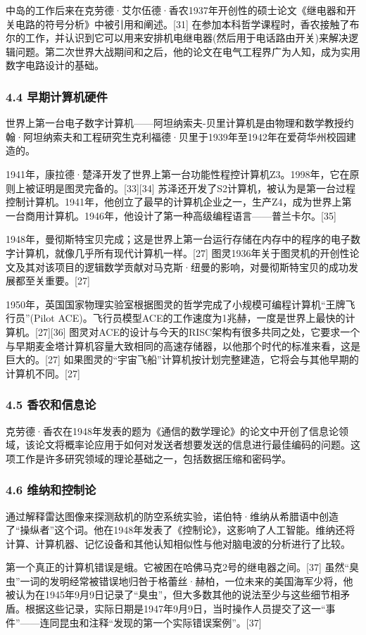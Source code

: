 中岛的工作后来在克劳德·艾尔伍德·香农1937年开创性的硕士论文《继电器和开关电路的符号分析》中被引用和阐述。[31] 在参加本科哲学课程时，香农接触了布尔的工作，并认识到它可以用来安排机电继电器(然后用于电话路由开关)来解决逻辑问题。第二次世界大战期间和之后，他的论文在电气工程界广为人知，成为实用数字电路设计的基础。
\subsubsection{4.4 早期计算机硬件}
世界上第一台电子数字计算机——阿坦纳索夫-贝里计算机是由物理和数学教授约翰·阿坦纳索夫和工程研究生克利福德·贝里于1939年至1942年在爱荷华州校园建造的。

1941年，康拉德·楚泽开发了世界上第一台功能性程控计算机Z3。1998年，它在原则上被证明是图灵完备的。[33][34] 苏泽还开发了S2计算机，被认为是第一台过程控制计算机。1941年，他创立了最早的计算机企业之一，生产Z4，成为世界上第一台商用计算机。1946年，他设计了第一种高级编程语言——普兰卡尔。[35]

1948年，曼彻斯特宝贝完成；这是世界上第一台运行存储在内存中的程序的电子数字计算机，就像几乎所有现代计算机一样。[27] 图灵1936年关于图灵机的开创性论文及其对该项目的逻辑数学贡献对马克斯·纽曼的影响，对曼彻斯特宝贝的成功发展都至关重要。[27]

1950年，英国国家物理实验室根据图灵的哲学完成了小规模可编程计算机“王牌飞行员”(Pilot ACE)。飞行员模型ACE的工作速度为1兆赫，一度是世界上最快的计算机。[27][36] 图灵对ACE的设计与今天的RISC架构有很多共同之处，它要求一个与早期麦金塔计算机容量大致相同的高速存储器，以他那个时代的标准来看，这是巨大的。[27] 如果图灵的“宇宙飞船”计算机按计划完整建造，它将会与其他早期的计算机不同。[27]
\subsubsection{4.5 香农和信息论}
克劳德·香农在1948年发表的题为《通信的数学理论》的论文中开创了信息论领域，该论文将概率论应用于如何对发送者想要发送的信息进行最佳编码的问题。这项工作是许多研究领域的理论基础之一，包括数据压缩和密码学。
\subsubsection{4.6 维纳和控制论}
通过解释雷达图像来探测敌机的防空系统实验，诺伯特·维纳从希腊语中创造了“操纵者”这个词。他在1948年发表了《控制论》，这影响了人工智能。维纳还将计算、计算机器、记忆设备和其他认知相似性与他对脑电波的分析进行了比较。

第一个真正的计算机错误是蛾。它被困在哈佛马克2号的继电器之间。[37] 虽然“臭虫”一词的发明经常被错误地归咎于格蕾丝·赫柏，一位未来的美国海军少将，他被认为在1945年9月9日记录了“臭虫”，但大多数其他的说法至少与这些细节相矛盾。根据这些记录，实际日期是1947年9月9日，当时操作人员提交了这一“事件”——连同昆虫和注释“发现的第一个实际错误案例”。[37]
